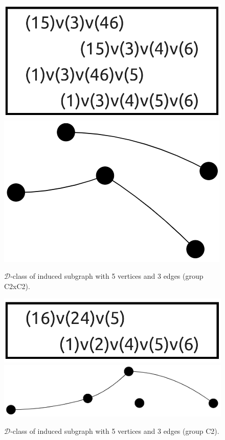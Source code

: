 \begin{appendices}
\begin{figure}[H]
\includegraphics[scale=0.1]{images/x1/x1_5v_3e_2.png}
\includegraphics[scale=0.15]{images/x1/x1_5v_3e_2_vis.png}
\caption{$\mathcal{D}$-class of induced subgraph with 5 vertices and 3 edges (group C2xC2).}
\end{figure}

\begin{figure}[H]
\includegraphics[scale=0.12]{images/x1/x1_5v_3e.png}
\includegraphics[scale=0.12]{images/x1/x1_5v_3e_1_vis.png}
\caption{$\mathcal{D}$-class of induced subgraph with 5 vertices and 3 edges (group C2).}
\end{figure}


\end{appendices}
